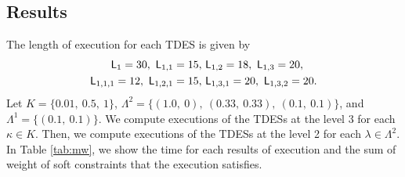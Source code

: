 \documentclass{article}
\newcommand{\Len}{{\sf L}}
\begin{document}
\subsection{Results}
%
The length of execution for each TDES is given by
\begin{align*}
\Len_1 = 30,~\Len_{1,1}=15,&~\Len_{1,2}=18,~\Len_{1,3}=20,
\\
\Len_{1,1,1} = 12,~\Len_{1,2,1}=15,&~\Len_{1,3,1}=20,~\Len_{1,3,2}=20.
\end{align*}
Let $K=\{0.01,~0.5,~1\}$, $\Lambda^2=\{(1.0,~0),~(0.33,~0.33),~(0.1,~0.1)\}$, and $\Lambda^1=\{(0.1,~0.1)\}$. 
%
We compute executions of the TDESs at the level 3 for each $\kappa\in K$.
Then, we compute executions of the TDESs at the level 2 for each $\lambda\in\Lambda^2$.
In Table \ref{tab:mw}, we show the time for each results of execution and the sum of weight of soft constraints that the execution satisfies.
\end{document}
